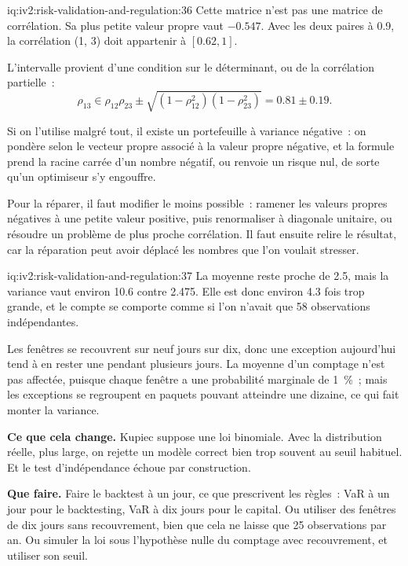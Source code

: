 \begin{solution}{iq:iv2:risk-validation-and-regulation:36}
Cette matrice n'est pas une matrice de corrélation. Sa plus petite valeur propre vaut $-0.547$. Avec les deux paires à 0.9, la corrélation (1, 3) doit appartenir à $[0.62, 1]$.

L'intervalle provient d'une condition sur le déterminant, ou de la corrélation partielle~:
\[
\rho_{13} \in \rho_{12}\rho_{23} \pm \sqrt{(1 - \rho_{12}^2)(1 - \rho_{23}^2)} = 0.81 \pm 0.19.
\]

Si on l'utilise malgré tout, il existe un portefeuille à variance négative~: on pondère selon le vecteur propre associé à la valeur propre négative, et la formule prend la racine carrée d'un nombre négatif, ou renvoie un risque nul, de sorte qu'un optimiseur s'y engouffre.

Pour la réparer, il faut modifier le moins possible~: ramener les valeurs propres négatives à une petite valeur positive, puis renormaliser à diagonale unitaire, ou résoudre un problème de plus proche corrélation. Il faut ensuite relire le résultat, car la réparation peut avoir déplacé les nombres que l'on voulait stresser.

\end{solution}

\begin{solution}{iq:iv2:risk-validation-and-regulation:37}
La moyenne reste proche de 2.5, mais la variance vaut environ 10.6 contre 2.475. Elle est donc environ 4.3 fois trop grande, et le compte se comporte comme si l'on n'avait que 58 observations indépendantes.

Les fenêtres se recouvrent sur neuf jours sur dix, donc une exception aujourd'hui tend à en rester une pendant plusieurs jours. La moyenne d'un comptage n'est pas affectée, puisque chaque fenêtre a une probabilité marginale de 1~\%~; mais les exceptions se regroupent en paquets pouvant atteindre une dizaine, ce qui fait monter la variance.

\textbf{Ce que cela change.} Kupiec suppose une loi binomiale. Avec la distribution réelle, plus large, on rejette un modèle correct bien trop souvent au seuil habituel. Et le test d'indépendance échoue par construction.

\textbf{Que faire.} Faire le backtest à un jour, ce que prescrivent les règles~: VaR à un jour pour le backtesting, VaR à dix jours pour le capital. Ou utiliser des fenêtres de dix jours sans recouvrement, bien que cela ne laisse que 25 observations par an. Ou simuler la loi sous l'hypothèse nulle du comptage avec recouvrement, et utiliser son seuil.

\end{solution}

